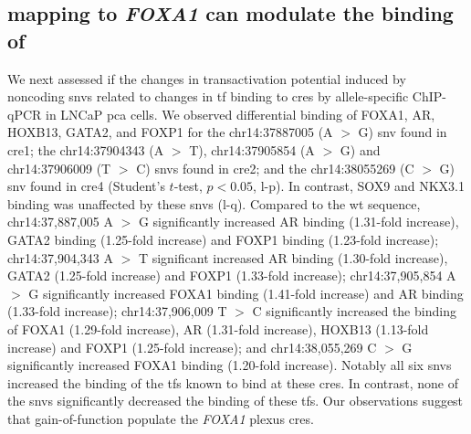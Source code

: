 \subsection{ mapping to \emph{FOXA1}  can modulate the binding of }

We next assessed if the changes in transactivation potential induced by noncoding \glspl{snv} related to changes in \gls{tf} binding to \glspl{cre} by allele-specific ChIP-qPCR \cite{baileyNoncodingSomaticInherited2016,zhangIntegrativeFunctionalGenomics2012,cowper-sal*lariBreastCancerRisk2012} in LNCaP \gls{pca} cells.
We observed differential binding of FOXA1, AR, HOXB13, GATA2, and FOXP1 for the chr14:37887005 (A $>$ G) \gls{snv} found in \gls{cre}1; the chr14:37904343 (A $>$ T), chr14:37905854 (A $>$ G) and chr14:37906009 (T $>$ C) \glspl{snv} found in \gls{cre}2; and the chr14:38055269 (C $>$ G) \gls{snv} found in \gls{cre}4 (Student's $t$-test, $p<0.05$, l-p).
In contrast, SOX9 and NKX3.1 binding was unaffected by these \glspl{snv} (l-q).
Compared to the \gls{wt} sequence, chr14:37,887,005 A $>$ G significantly increased AR binding (1.31-fold increase), GATA2 binding (1.25-fold increase) and FOXP1 binding (1.23-fold increase); chr14:37,904,343 A $>$ T significant increased AR binding (1.30-fold increase), GATA2 (1.25-fold increase) and FOXP1 (1.33-fold increase); chr14:37,905,854 A $>$ G significantly increased FOXA1 binding (1.41-fold increase) and AR binding (1.33-fold increase); chr14:37,906,009 T $>$ C significantly increased the binding of FOXA1 (1.29-fold increase), AR (1.31-fold increase), HOXB13 (1.13-fold increase) and FOXP1 (1.25-fold increase); and chr14:38,055,269 C $>$ G significantly increased FOXA1 binding (1.20-fold increase).
Notably all six \glspl{snv} increased the binding of the \glspl{tf} known to bind at these \glspl{cre}.
In contrast, none of the \glspl{snv} significantly decreased the binding of these \glspl{tf}.
Our observations suggest that gain-of-function populate the \emph{FOXA1} plexus \glspl{cre}.
